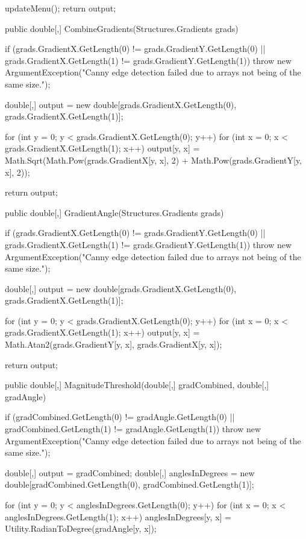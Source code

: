 \begin{flushleft}
\begin{cscode}
{{        updateMenu();
        return output;
    }

    public double[,] CombineGradients(Structures.Gradients grads)
    {
        if (grads.GradientX.GetLength(0) != grads.GradientY.GetLength(0) || grads.GradientX.GetLength(1) != grads.GradientY.GetLength(1))
            throw new ArgumentException("Canny edge detection failed due to arrays not being of the same size.");

        double[,] output = new double[grads.GradientX.GetLength(0), grads.GradientX.GetLength(1)];

        for (int y = 0; y < grads.GradientX.GetLength(0); y++)
        {
            for (int x = 0; x < grads.GradientX.GetLength(1); x++)
            {
                output[y, x] = Math.Sqrt(Math.Pow(grads.GradientX[y, x], 2) + Math.Pow(grads.GradientY[y, x], 2));
            }
        }

        return output;
    }

    public double[,] GradientAngle(Structures.Gradients grads)
    {
        if (grads.GradientX.GetLength(0) != grads.GradientY.GetLength(0) || grads.GradientX.GetLength(1) != grads.GradientY.GetLength(1))
            throw new ArgumentException("Canny edge detection failed due to arrays not being of the same size.");

        double[,] output = new double[grads.GradientX.GetLength(0), grads.GradientX.GetLength(1)];

        for (int y = 0; y < grads.GradientX.GetLength(0); y++)
        {
            for (int x = 0; x < grads.GradientX.GetLength(1); x++)
            {
                output[y, x] = Math.Atan2(grads.GradientY[y, x], grads.GradientX[y, x]);
            }
        }

        return output;
    }

    public double[,] MagnitudeThreshold(double[,] gradCombined, double[,] gradAngle)
    {
        if (gradCombined.GetLength(0) != gradAngle.GetLength(0) || gradCombined.GetLength(1) != gradAngle.GetLength(1))
            throw new ArgumentException("Canny edge detection failed due to arrays not being of the same size.");

        double[,] output = gradCombined;
        double[,] anglesInDegrees = new double[gradCombined.GetLength(0), gradCombined.GetLength(1)];

        for (int y = 0; y < anglesInDegrees.GetLength(0); y++)
        {
            for (int x = 0; x < anglesInDegrees.GetLength(1); x++)
            {
                anglesInDegrees[y, x] = Utility.RadianToDegree(gradAngle[y, x]);
            }
        }

}}
\end{cscode}
\end{flushleft}
